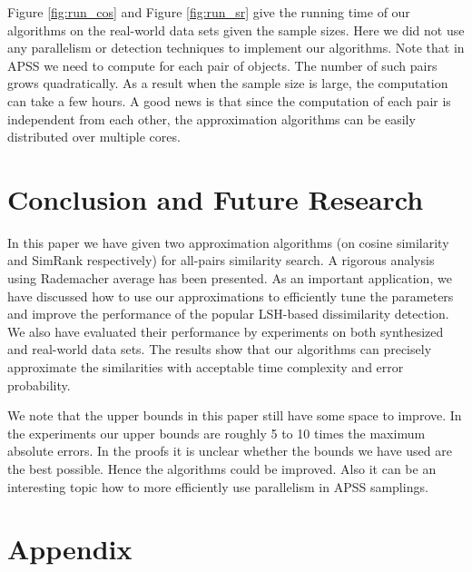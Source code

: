 \documentclass{article}
\begin{document}
Figure \ref{fig:run_cos} and Figure \ref{fig:run_sr} give the running time of our algorithms on the real-world data sets given the sample sizes. Here we did not use any parallelism or detection techniques to implement our algorithms. Note that in APSS we need to compute for each pair of objects. The number of such pairs grows quadratically. As a result when the sample size is large, the computation can take a few hours. A good news is that since the computation of each pair is independent from each other, the approximation algorithms can be easily distributed over multiple cores.

\section{Conclusion and Future Research}
\label{sec:con}
In this paper we have given two approximation algorithms (on cosine similarity and SimRank respectively) for all-pairs similarity search. 
A rigorous analysis using Rademacher average has been presented. 
{\color{black}As an important application, we have discussed how to use our approximations to efficiently tune the parameters and improve the performance of the popular LSH-based dissimilarity detection. }
We also have evaluated their performance by experiments on both synthesized and real-world data sets. The results show that our algorithms can precisely approximate the similarities with acceptable time complexity and error probability. 

We note that the upper bounds in this paper still have some space to improve. In the experiments our upper bounds are roughly 5 to 10 times the maximum absolute errors. In the proofs it is unclear whether the bounds we have used are the best possible. Hence the algorithms could be improved. Also it can be an interesting topic how to more efficiently use parallelism in APSS samplings.

%



\section{Appendix}

\end{document}
